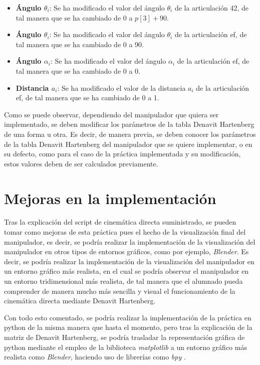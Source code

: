 \documentclass[11pt]{report}
\begin{document}
\begin{itemize}
    \item \textbf{Ángulo $\theta_i$}: Se ha modificado el valor del ángulo $\theta_i$ de la articulación 42, de tal manera que se ha cambiado de 0 a $p[3] + 90$.
    \item \textbf{Ángulo $\theta_i$}: Se ha modificado el valor del ángulo $\theta_i$ de la articulación ef, de tal manera que se ha cambiado de 0 a 90.
    \item \textbf{Ángulo $\alpha_i$}: Se ha modificado el valor del ángulo $\alpha_i$ de la articulación ef, de tal manera que se ha cambiado de 0 a 0.
    \item \textbf{Distancia $a_i$}: Se ha modificado el valor de la distancia $a_i$ de la articulación ef, de tal manera que se ha cambiado de 0 a 1.
\end{itemize}

Como se puede observar, dependiendo del manipulador que quiera ser implementado, se deben modificar los parámetros de la tabla Denavit Hartenberg de una forma u otra. Es decir, de manera previa, se deben conocer los parámetros de la tabla Denavit Hartenberg del manipulador que se quiere implementar, o en su defecto, como para el caso de la práctica implementada y su modificación, estos valores deben de ser calculados previamente.

\section{Mejoras en la implementación}

Tras la explicación del script de cinemática directa suministrado, se pueden tomar como mejoras de esta práctica pues el hecho de la visualización final del manipulador, es decir, se podría realizar la implementación de la visualización del manipulador en otros tipos de entornos gráficos, como por ejemplo, \emph{Blender}. Es decir, se podría realizar la implementación de la visualización del manipulador en un entorno gráfico más realista, en el cual se podría observar el manipulador en un entorno tridimensional más realista, de tal manera que el alumnado pueda comprender de manera mucho más sencilla y visual el funcionamiento de la cinemática directa mediante Denavit Hartenberg.

Con todo esto comentado, se podría realizar la implementación de la práctica en python de la misma manera que hasta el momento, pero tras la explicación de la matriz de Denavit Hartenberg, se podría trasladar la representación gráfica de python mediante el empleo de la biblioteca \emph{matplotlib} a un entorno gráfico más realista como \emph{Blender}, haciendo uso de librerías como \emph{bpy} \cite{6}.
\end{document}
